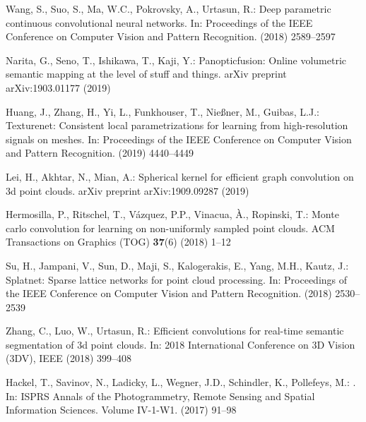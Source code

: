 \documentclass[runningheads]{llncs}
\begin{document}
\begin{thebibliography}{10}
Wang, S., Suo, S., Ma, W.C., Pokrovsky, A., Urtasun, R.:
\newblock Deep parametric continuous convolutional neural networks.
\newblock In: Proceedings of the IEEE Conference on Computer Vision and Pattern
  Recognition. (2018)  2589--2597

Narita, G., Seno, T., Ishikawa, T., Kaji, Y.:
\newblock Panopticfusion: Online volumetric semantic mapping at the level of
  stuff and things.
\newblock arXiv preprint arXiv:1903.01177 (2019)

Huang, J., Zhang, H., Yi, L., Funkhouser, T., Nie{\ss}ner, M., Guibas, L.J.:
\newblock Texturenet: Consistent local parametrizations for learning from
  high-resolution signals on meshes.
\newblock In: Proceedings of the IEEE Conference on Computer Vision and Pattern
  Recognition. (2019)  4440--4449

Lei, H., Akhtar, N., Mian, A.:
\newblock Spherical kernel for efficient graph convolution on 3d point clouds.
\newblock arXiv preprint arXiv:1909.09287 (2019)

Hermosilla, P., Ritschel, T., V{\'a}zquez, P.P., Vinacua, {\`A}., Ropinski, T.:
\newblock Monte carlo convolution for learning on non-uniformly sampled point
  clouds.
\newblock ACM Transactions on Graphics (TOG) \textbf{37}(6) (2018)  1--12

Su, H., Jampani, V., Sun, D., Maji, S., Kalogerakis, E., Yang, M.H., Kautz, J.:
\newblock Splatnet: Sparse lattice networks for point cloud processing.
\newblock In: Proceedings of the IEEE Conference on Computer Vision and Pattern
  Recognition. (2018)  2530--2539

Zhang, C., Luo, W., Urtasun, R.:
\newblock Efficient convolutions for real-time semantic segmentation of 3d
  point clouds.
\newblock In: 2018 International Conference on 3D Vision (3DV), IEEE (2018)
  399--408

Hackel, T., Savinov, N., Ladicky, L., Wegner, J.D., Schindler, K., Pollefeys,
  M.:
.
\newblock In: ISPRS Annals of the Photogrammetry, Remote Sensing and Spatial
  Information Sciences. Volume IV-1-W1. (2017)  91--98

\end{thebibliography}
 
\end{document}
